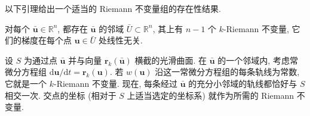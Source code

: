 以下引理给出一个适当的 Riemann 不变量组的存在性结果.

\begin{Lemma}
\label{lem:riemann-invariants-existence}
对每个 $\bar{\bm{u}}\in\mathbb{R}^n$, 都存在 $\bar{\bm{u}}$ 的邻域 $\bar U\subset\mathbb{R}^n$, 其上有 $n-1$ 个 $k$-Riemann 不变量, 它们的梯度在每个点 $\bm{u}\in\bar U$ 处线性无关.
\end{Lemma}

\begin{Proof}
设 $S$ 为通过点 $\bar{\bm{u}}$ 并与向量 $\bm{r}_k(\bar{\bm{u}})$ 横截的光滑曲面. 在 $\bar{\bm{u}}$ 的一个邻域内, 考虑常微分方程组 $\mathrm{d}\bm{u}/\mathrm{d}t=\bm{r}_k(\bm{u})$. 若 $w(\bm{u})$ 沿这一常微分方程组的每条轨线为常数, 它就是一个 $k$-Riemann 不变量. 现在, 每条经过 $\bar{\bm{u}}$ 的充分小邻域的轨线都恰好与 $S$ 相交一次. 交点的坐标 (相对于 $S$ 上适当选定的坐标系) 就作为所需的 Riemann 不变量.
\end{Proof}


